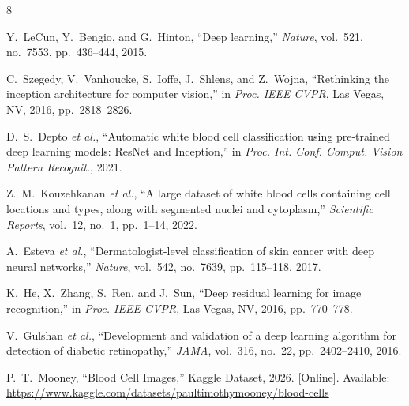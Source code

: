 \documentclass[conference]{IEEEtran}
\begin{document}
\begin{thebibliography}{8}

Y.~LeCun, Y.~Bengio, and G.~Hinton, ``Deep learning,'' \textit{Nature}, vol.~521, no.~7553, pp.~436--444, 2015.

C.~Szegedy, V.~Vanhoucke, S.~Ioffe, J.~Shlens, and Z.~Wojna, ``Rethinking the inception architecture for computer vision,'' in \textit{Proc. IEEE CVPR}, Las Vegas, NV, 2016, pp.~2818--2826.

D.~S.~Depto \textit{et al.}, ``Automatic white blood cell classification using pre-trained deep learning models: ResNet and Inception,'' in \textit{Proc. Int. Conf. Comput. Vision Pattern Recognit.}, 2021.

Z.~M.~Kouzehkanan \textit{et al.}, ``A large dataset of white blood cells containing cell locations and types, along with segmented nuclei and cytoplasm,'' \textit{Scientific Reports}, vol.~12, no.~1, pp.~1--14, 2022.

A.~Esteva \textit{et al.}, ``Dermatologist-level classification of skin cancer with deep neural networks,'' \textit{Nature}, vol.~542, no.~7639, pp.~115--118, 2017.

K.~He, X.~Zhang, S.~Ren, and J.~Sun, ``Deep residual learning for image recognition,'' in \textit{Proc. IEEE CVPR}, Las Vegas, NV, 2016, pp.~770--778.

V.~Gulshan \textit{et al.}, ``Development and validation of a deep learning algorithm for detection of diabetic retinopathy,'' \textit{JAMA}, vol.~316, no.~22, pp.~2402--2410, 2016.

P.~T.~Mooney, ``Blood Cell Images,'' Kaggle Dataset, 2026. [Online]. Available: \url{https://www.kaggle.com/datasets/paultimothymooney/blood-cells}

\end{thebibliography}
\end{document}
